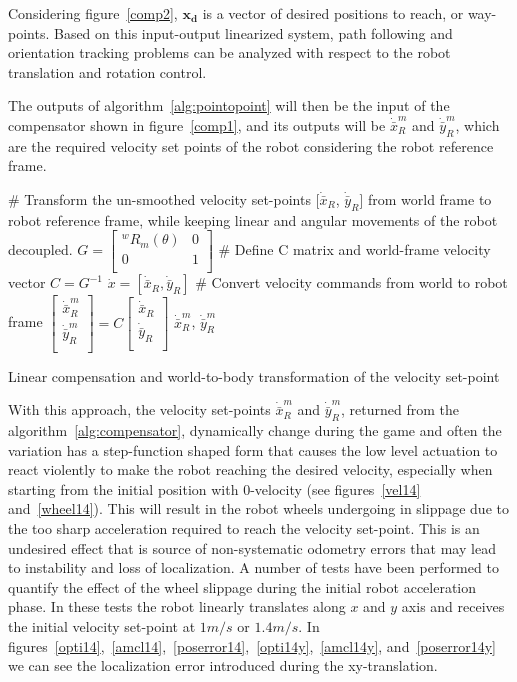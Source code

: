 Considering figure~\ref{comp2}, $\mathbf{x_d}$ is a vector of desired positions to reach, or way-points.
Based on this input-output linearized system, path following and orientation tracking problems can be analyzed with respect to the robot translation and rotation control.

The outputs of algorithm~\ref{alg:pointopoint} will then be the input of the compensator shown in figure~\ref{comp1}, and its outputs will be $\dot{\bar{x}}_R^m$ and $\dot{\bar{y}}_R^m$, which are the required velocity set points of the robot considering the robot reference frame.

\begin{algorithm}[h]
	\# Transform the un-smoothed velocity set-points [$\dot{\bar{x}}_R$, $\dot{\bar{y}}_R$] from world frame to robot reference frame, while keeping linear and angular movements of the robot decoupled.\;
	$G=\begin{bmatrix}
	^wR_m(\theta) & 0\\
	0 & 1\\
	\end{bmatrix}$\;
	\# Define C matrix and world-frame velocity vector\;
	$C = G^{-1}$\;
	$\dot{x}=[\dot{\bar{x}}_R, \dot{\bar{y}}_R]$\;
	\# Convert velocity commands from world to robot frame\;
	$\begin{bmatrix}
	\dot{\bar{x}}_R^m\\
	\dot{\bar{y}}_R^m\\
	\end{bmatrix}=C
	\begin{bmatrix}
	\dot{\bar{x}}_R\\
	\dot{\bar{y}}_R\\
	\end{bmatrix}
	$\;
	\Return $\dot{\bar{x}}_R^m$, $\dot{\bar{y}}_R^m$
	\caption{Linear compensation and world-to-body transformation of the velocity set-point} 
	\label{alg:compensator}
\end{algorithm}

With this approach, the velocity set-points $\dot{\bar{x}}_R^m$ and $\dot{\bar{y}}_R^m$, returned from the algorithm~\ref{alg:compensator}, dynamically change during the game and often the variation has a step-function shaped form that causes the low level actuation to react violently to make the robot reaching the desired velocity, especially when starting from the initial position with 0-velocity (see figures~\ref{vel14} and~\ref{wheel14}).
This will result in the robot wheels undergoing in slippage due to the too sharp acceleration required to reach the velocity set-point. This is an undesired effect that is source of non-systematic odometry errors that may lead to instability and loss of localization. A number of tests have been performed to quantify the effect of the wheel slippage during the initial robot acceleration phase. In these tests the robot linearly translates along $x$ and $y$ axis and receives the initial velocity set-point at $1m/s$ or $1.4m/s$. In figures~\ref{opti14},~\ref{amcl14},~\ref{poserror14},~\ref{opti14y},~\ref{amcl14y}, and~\ref{poserror14y} we can see the localization error introduced during the xy-translation.

